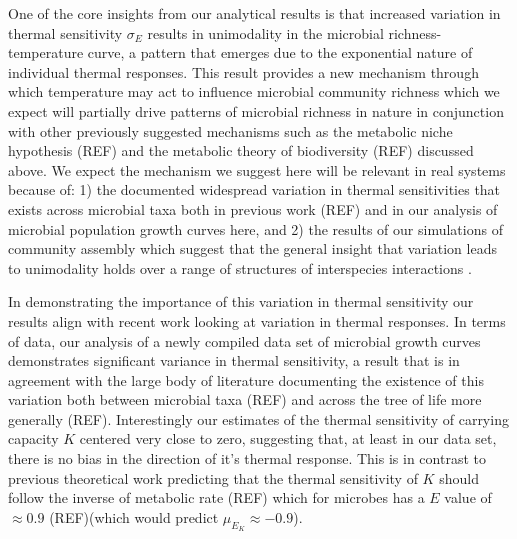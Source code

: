 \documentclass{article}
\begin{document}
One of the core insights from our analytical results is that increased variation in thermal sensitivity $\sigma_E$ results in unimodality in the microbial richness-temperature curve, a pattern that emerges due to the exponential nature of individual thermal responses. This result provides a new mechanism through which temperature may act to influence microbial community richness which we expect will partially drive patterns of microbial richness in nature in conjunction with other previously suggested mechanisms such as the metabolic niche hypothesis (REF) and the metabolic theory of biodiversity (REF) discussed above. We expect the mechanism we suggest here will be relevant in real systems because of: 1) the documented widespread variation in thermal sensitivities that exists across microbial taxa both in previous work (REF) and in our analysis of microbial population growth curves here, and 2) the results of our simulations of community assembly which suggest that the general insight that variation leads to unimodality holds over a range of structures of interspecies interactions . 

In demonstrating the importance of this variation in thermal sensitivity our results align with recent work looking at variation in thermal responses. In terms of data, our analysis of a newly compiled data set of microbial growth curves demonstrates significant variance in thermal sensitivity, a result that is in agreement with the large body of literature documenting the existence of this variation both between microbial taxa (REF) and across the tree of life more generally (REF). Interestingly our estimates of the thermal sensitivity of carrying capacity $K$ centered very close to zero, suggesting that, at least in our data set, there is no bias in the direction of it's thermal response. This is in contrast to previous theoretical work predicting that the thermal sensitivity of $K$ should follow the inverse of metabolic rate (REF) which for microbes has a $E$ value of $\approx 0.9$ (REF)(which would predict $\mu_{E_K} \approx -0.9$).
\end{document}
